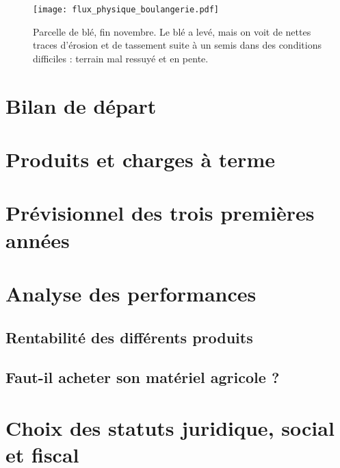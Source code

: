 \documentclass{book}
\begin{document}
\begin{figure}[h!]
\begin{center}
	\texttt{[image: flux\_physique\_boulangerie.pdf]}
	\caption{Parcelle de blé, fin novembre. Le blé a levé, mais on voit de nettes traces d'érosion et de tassement suite à un semis dans des conditions difficiles : terrain mal ressuyé et en pente.}
	\label{fig:rot_cercle}
\end{center}
\end{figure}

\section{Bilan de départ}

\section{Produits et charges à terme}

\section{Prévisionnel des trois premières années}

\section{Analyse des performances}

\subsection{Rentabilité des différents produits}

\subsection{Faut-il acheter son matériel agricole ?}

\section{Choix des statuts juridique, social et fiscal}
\end{document}

